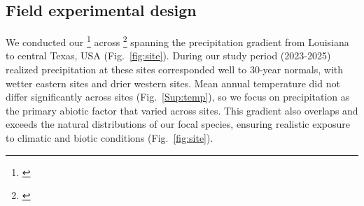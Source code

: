 \documentclass[12pt]{article}\usepackage[]{graphicx}\usepackage[dvipsnames]{xcolor}
\newcommand{\tom}[2]{{\color{red}{#1}}\footnote{\textit{\color{red}{#2}}}}
\begin{document}
\subsection*{Field experimental design}
We conducted our \tom{field experiment}{In the figure caption you describe the sites as common garden sites. If you want to use that language you should also include it here.} across \tom{seven sites}{You should create a table for the lat long of each site and a brief description of the site. This can go in a supplement. Lot/Long is important for meta-analysis, as you know.} spanning the precipitation gradient from Louisiana to central Texas, USA (Fig.~\ref{fig:site}). 
During our study period (2023-2025) realized precipitation at these sites corresponded well to 30-year normals, with wetter eastern sites and drier western sites. 
Mean annual temperature did not differ significantly across sites (Fig.~\ref{Sup:temp}), so we focus on precipitation as the primary abiotic factor that varied across sites.  
This gradient also overlaps and exceeds the natural distributions of our focal species, ensuring realistic exposure to climatic and biotic conditions (Fig.~\ref{fig:site}).  
\end{document}

